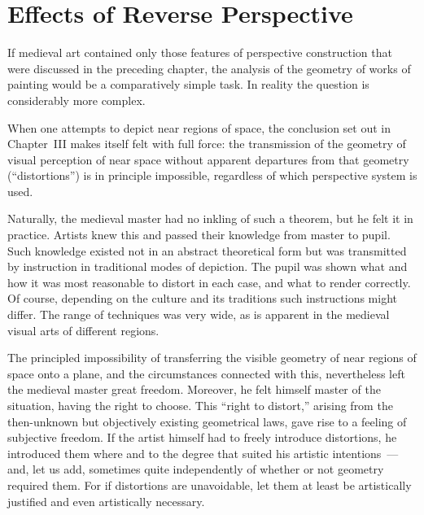 
\chapter{Effects of Reverse Perspective}


If medieval art contained only those features of perspective construction that were
discussed in the preceding chapter, the analysis of the geometry of works of painting
would be a comparatively simple task.  In reality the question is considerably more
complex.

When one attempts to depict near regions of space, the conclusion set out in
Chapter~III makes itself felt with full force: the transmission of the geometry of
visual perception of near space without apparent departures from that geometry
(``distortions'') is in principle impossible, regardless of which perspective system
is used.

Naturally, the medieval master had no inkling of such a theorem, but he felt it in
practice.  Artists knew this and passed their knowledge from master to pupil.  Such
knowledge existed not in an abstract theoretical form but was transmitted by
instruction in traditional modes of depiction.  The pupil was shown what and how it
was most reasonable to distort in each case, and what to render correctly.  Of
course, depending on the culture and its traditions such instructions might differ.
The range of techniques was very wide, as is apparent in the medieval visual arts of
different regions.

The principled impossibility of transferring the visible geometry of near regions of
space onto a plane, and the circumstances connected with this, nevertheless left the
medieval master great freedom.  Moreover, he felt himself master of the situation,
having the right to choose.  This ``right to distort,'' arising from the then-unknown
but objectively existing geometrical laws, gave rise to a feeling of subjective
freedom.  If the artist himself had to freely introduce distortions, he introduced
them where and to the degree that suited his artistic intentions~--- and, let us add,
sometimes quite independently of whether or not geometry required them.  For if
distortions are unavoidable, let them at least be artistically justified and even
artistically necessary.

